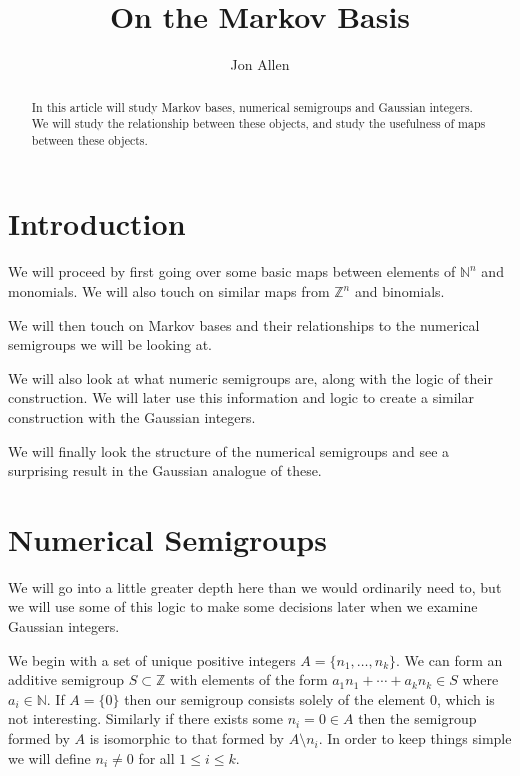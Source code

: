 \documentclass[11pt]{amsart}
\theoremstyle{plain}
\theoremstyle{definition}
\begin{document}
\title{On the Markov Basis}
\author{Jon Allen}
\begin{abstract}
In this article will study Markov bases, numerical semigroups and Gaussian
integers. We will study the relationship between these objects, and study  the
usefulness of maps between these objects.
\end{abstract}
\maketitle
\section{Introduction}
We will proceed by first going over some basic maps between elements of
$\mathbb{N}^n$ and monomials. We will also touch on similar maps from
$\mathbb{Z}^n$ and binomials.

We will then touch on Markov bases and their relationships to the numerical
semigroups we will be looking at.

We will also look at what numeric semigroups are, along with the logic of their
construction. We will later use this information and logic to create a similar
construction with the Gaussian integers.

We will finally look the structure of the numerical semigroups and see a
surprising result in the Gaussian analogue of these.

\section{Numerical Semigroups}
We will go into a little greater depth here than we would ordinarily need to, but we will use some of this logic to make some decisions later when we examine Gaussian integers.

We begin with a set of unique positive integers $A=\{n_1,\dots,n_k\}$.
We can form an additive semigroup $S\subset \mathbb{Z}$ with elements of the
form $a_1n_1+\cdots+{a_k}n_k\in S$ where $a_i\in \mathbb{N}$. If $A=\{0\}$ then
our semigroup consists solely of the element $0$, which is not interesting.
Similarly if there exists some $n_i=0\in A$ then the semigroup formed by $A$ is
isomorphic to that formed by $A\setminus n_i$. In order to keep things simple we
will define $n_i\ne 0$ for all $1\le i\le k$.
\end{document}
